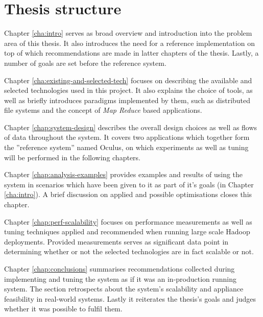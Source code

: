 \section{Thesis structure}
Chapter \ref{cha:intro} serves as broad overview and introduction into the problem area of this thesis. It also introduces the need for a reference implementation on top of which recommendations are made in latter chapters of the thesis. Lastly, a number of goals are set before the reference system.

Chapter \ref{cha:existing-and-selected-tech} focuses on describing the available and selected technologies used in this project. It also explains the choice of tools, as well as briefly introduces paradigms implemented by them, such as distributed file systems and the concept of \textit{Map Reduce} \cite{map-reduce} based applications.

Chapter \ref{chap:system-design} describes the overall design choices as well as flows of data throughout the system. It covers two applications which together form the ''reference system'' named Oculus, on which experiments as well as tuning will be performed in the following chapters.

Chapter \ref{chap:analysis-examples} provides examples and results of using the system in scenarios which have been given to it as part of it's goals (in Chapter \ref{cha:intro}). A brief discussion on applied and possible optimisations closes this chapter.

Chapter \ref{chap:perf-scalability} focuses on performance measurements as well as tuning techniques applied and recommended when running large scale Hadoop deployments. Provided measurements serves as significant data point in determining whether or not the selected technologies are in fact scalable or not.

Chapter \ref{chap:conclusions} summarises recommendations collected during implementing and tuning the system as if it was an in-production running system. The section retrospects about the system's scalability and appliance feasibility in real-world systems. Lastly it reiterates the thesis's goals and judges whether it was possible to fulfil them.






